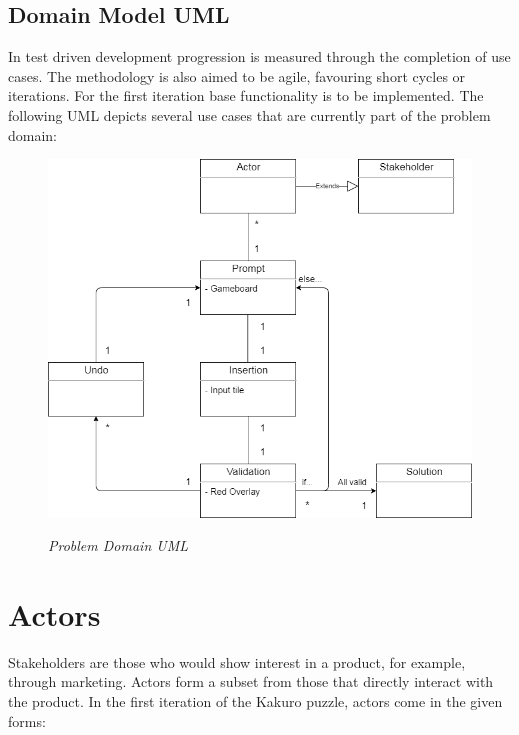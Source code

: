 \documentclass[12pt]{article}
\begin{document}
\clearpage

\subsection{Domain Model UML}
In test driven development progression is measured through the completion of use cases. The methodology is also aimed to be agile, favouring short cycles or iterations. For the first iteration base functionality is to be implemented. The following UML depicts several use cases that are currently part of the problem domain:\\

\begin{figure}[htbp]
\centerline{\includegraphics[scale=.6]{TempUML.png}}
\centerline{\textit {Problem Domain UML}}
\end{figure}

\clearpage

\section{Actors}

Stakeholders are those who would show interest in a product, for example, through marketing. Actors form a subset from those that directly interact with the product. In the first iteration of the Kakuro puzzle, actors come in the given forms:
\end{document}
